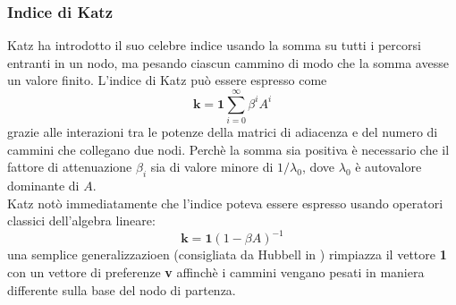 \subsubsection{Indice di Katz}
Katz ha introdotto il suo celebre indice %
usando la somma su tutti i percorsi entranti in un nodo, ma pesando ciascun cammino di modo che la somma avesse un valore finito. L'indice di Katz può essere espresso come
\begin{equation}
    \textbf{k} = \textbf{1} \sum_{i = 0}^{\infty}{\beta^i A^i}
\end{equation}
grazie alle interazioni tra le potenze della matrici di adiacenza e del numero di cammini che collegano due nodi. Perchè la somma sia positiva è necessario che il fattore di attenuazione $\beta_i$ sia di valore minore di $1 / \lambda_0$, dove $\lambda_0$ è autovalore dominante di $A$.\\
Katz notò immediatamente che l'indice poteva essere espresso usando operatori classici dell'algebra lineare:
\begin{equation}
    \textbf{k} = \textbf{1}(1 - \beta A)^{-1}
\end{equation}
una semplice generalizzazioen (consigliata da Hubbell in %
) rimpiazza il vettore \textbf{1} con un vettore di preferenze \textbf{v} affinchè i cammini vengano pesati in maniera differente sulla base del nodo di partenza.